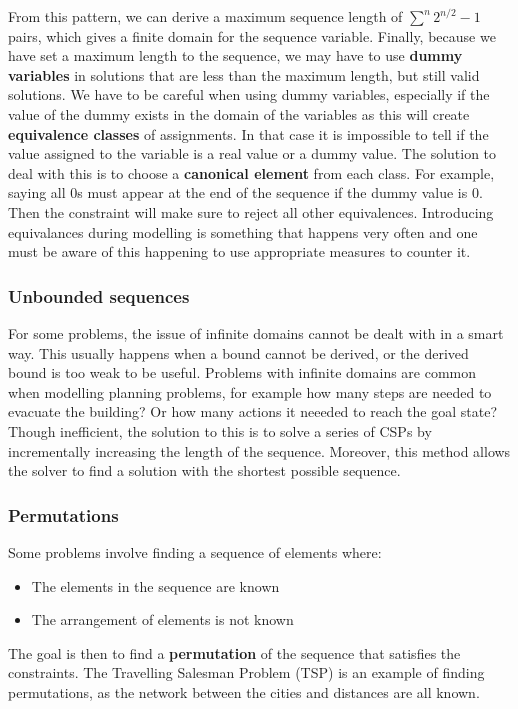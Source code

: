 \documentclass[CS4402-Notes.tex]{subfiles}
\begin{document}
From this pattern, we can derive a maximum sequence length of $\sum^{n}2^{n/2} - 1$ pairs, which gives a finite domain for the sequence variable. Finally, because we have set a maximum length to the sequence, we may have to use \textbf{dummy variables} in solutions that are less than the maximum length, but still valid solutions.
\n
We have to be careful when using dummy variables, especially if the value of the dummy exists in the domain of the variables as this will create \textbf{equivalence classes} of assignments. In that case it is impossible to tell if the value assigned to the variable is a real value or a dummy value. The solution to deal with this is to choose a \textbf{canonical element} from each class. For example, saying all 0s must appear at the end of the sequence if the dummy value is 0. Then the constraint will make sure to reject all other equivalences. Introducing equivalances during modelling is something that happens very often and one must be aware of this happening to use appropriate measures to counter it.

\subsubsection{Unbounded sequences}
For some problems, the issue of infinite domains cannot be dealt with in a smart way. This usually happens when a bound cannot be derived, or the derived bound is too weak to be useful. Problems with infinite domains are common when modelling planning problems, for example how many steps are needed to evacuate the building? Or how many actions it neeeded to reach the goal state?
\n
Though inefficient, the solution to this is to solve a series of CSPs by incrementally increasing the length of the sequence. Moreover, this method allows the solver to find a solution with the shortest possible sequence.

\subsubsection{Permutations}
Some problems involve finding a sequence of elements where:
\begin{itemize}
\item The elements in the sequence are known
\item The arrangement of elements is not known
\end{itemize}
The goal is then to find a \textbf{permutation} of the sequence that satisfies the constraints. The Travelling Salesman Problem (TSP) is an example of finding permutations, as the network between the cities and distances are all known.
\end{document}
